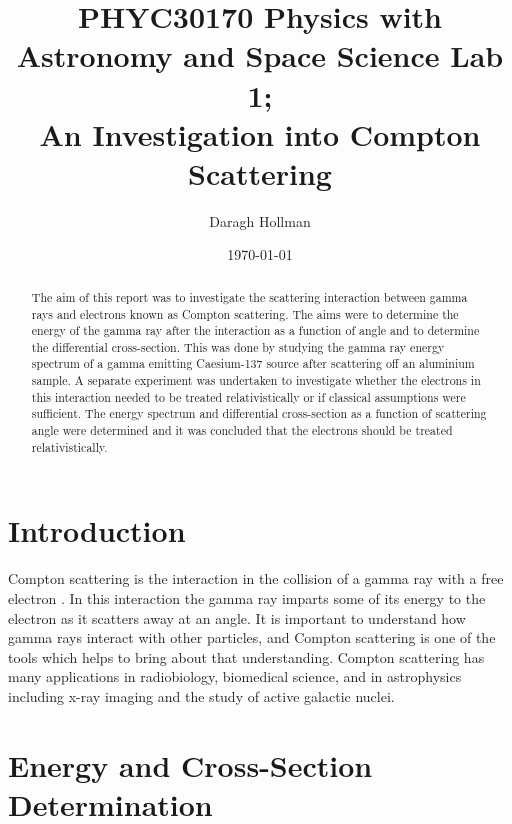 \documentclass[%
reprint,
amsmath,amssymb,
aps,
floatfix
]{revtex4-2}
\begin{document}
	
	
	\title{PHYC30170 Physics with Astronomy and Space Science Lab 1;\\An Investigation into Compton Scattering}
	
	\author{Daragh Hollman}
	
	\date{\today}
	
	\begin{abstract}
		The aim of this report was to investigate the scattering interaction between gamma rays and electrons known as Compton scattering. The aims were to determine the energy of the gamma ray after the interaction as a function of angle and to determine the differential cross-section. This was done by studying the gamma ray energy spectrum of a gamma emitting Caesium-137 source after scattering off an aluminium sample. A separate experiment was undertaken to investigate whether the electrons in this interaction needed to be treated relativistically or if classical assumptions were sufficient. The energy spectrum and differential cross-section as a function of scattering angle were determined and it was concluded that the electrons should be treated relativistically.
	\end{abstract}

	\maketitle
	
	\section{Introduction}
	Compton scattering is the interaction in the collision of a gamma ray with a free electron \cite{manual1}. In this interaction the gamma ray imparts some of its energy to the electron as it scatters away at an angle. It is important to understand how gamma rays interact with other particles, and Compton scattering is one of the tools which helps to bring about that understanding. Compton scattering has many applications in radiobiology, biomedical science, and in astrophysics \cite{KURODA2011S183}\cite{harding}\cite{alessia} including x-ray imaging and the study of active galactic nuclei.
	
	\section{Energy and Cross-Section Determination}
	
\end{document}
